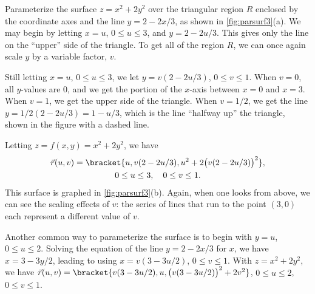 \begin{example}\label{ex_parsurf3}
Parameterize the surface $z=x^2+2y^2$ over the triangular region $R$ enclosed by the coordinate axes and the line $y=2-2x/3$, as shown in \autoref{fig:parsurf3}(a).
\solution
We may begin by letting $x=u$, $0\leq u\leq 3$,  and $y = 2-2u/3$. This gives only the line on the ``upper'' side of the triangle. To get all of the region $R$, we can once again scale $y$ by a variable factor, $v$.

Still letting $x = u$, $0\leq u\leq 3$, we let $y = v(2-2u/3)$, $0\leq v\leq 1$. When $v=0$, all $y$-values are 0, and we get the portion of the $x$-axis between $x=0$ and $x=3$. When $v=1$, we get the upper side of the triangle. When $v=1/2$, we get the line $y=1/2(2-2u/3) = 1-u/3$, which is the line ``halfway up'' the triangle, shown in the figure with a dashed line.

Letting $z = f(x,y) = x^2+2y^2$, we have
\begin{multline*}
\vec r(u,v) =\bracket{u, v(2-2u/3), u^2+2\bigl(v(2-2u/3)\bigr)^2},\\
0\leq u\leq 3,\quad 0\leq v\leq 1.
\end{multline*}
This surface is graphed in \autoref{fig:parsurf3}(b). Again, when one looks from above, we can see the scaling effects of $v$: the series of lines that run to the point $(3,0)$ each represent a different value of $v$.

Another common way to parameterize the surface is to begin with $y=u$, $0\leq u\leq 2$. Solving the equation of the line $y=2-2x/3$ for $x$, we have $x = 3-3y/2$, leading to using $x=v(3-3u/2)$, $0\leq v\leq 1$. With $z=x^2+2y^2$, we have $\vec r(u,v) =\bracket{v(3-3u/2),u, \bigl(v(3-3u/2)\bigr)^2+2v^2}$, $0\leq u\leq 2$, $0\leq v\leq 1$.
\end{example}

